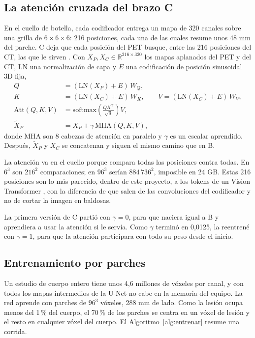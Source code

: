 \subsection{La atención cruzada del brazo C}

En el cuello de botella, cada codificador entrega un mapa de 320 canales sobre una grilla de $6\times6\times6$: 216 posiciones, cada una de las cuales resume unos 48 mm del parche. C deja que cada posición del PET busque, entre las 216 posiciones del CT, las que le sirven \citep{vaswani2017}. Con $X_P, X_C \in \mathbb{R}^{216\times320}$ los mapas aplanados del PET y del CT, $\mathrm{LN}$ una normalización de capa y $E$ una codificación de posición sinusoidal 3D fija,
\begin{align}
Q &= (\mathrm{LN}(X_P)+E)\,W_Q, \\
K &= (\mathrm{LN}(X_C)+E)\,W_K, \qquad V = (\mathrm{LN}(X_C)+E)\,W_V, \\
\mathrm{Att}(Q,K,V) &= \mathrm{softmax}\!\left(\frac{QK^\top}{\sqrt{d}}\right) V, \\
\tilde X_P &= X_P + \gamma\,\mathrm{MHA}(Q,K,V),
\end{align}
donde MHA son 8 cabezas de atención en paralelo y $\gamma$ es un escalar aprendido. Después, $\tilde X_P$ y $X_C$ se concatenan y siguen el mismo camino que en B.

La atención va en el cuello porque compara todas las posiciones contra todas. En $6^3$ son $216^2$ comparaciones; en $96^3$ serían $884\,736^2$, imposible en 24 GB. Estas 216 posiciones son lo más parecido, dentro de este proyecto, a los tokens de un Vision Transformer \citep{dosovitskiy2021,hatamizadeh2022}, con la diferencia de que salen de las convoluciones del codificador y no de cortar la imagen en baldosas.

La primera versión de C partió con $\gamma=0$, para que naciera igual a B y aprendiera a usar la atención si le servía. Como $\gamma$ terminó en 0,0125, la reentrené con $\gamma=1$, para que la atención participara con todo su peso desde el inicio.

\subsection{Entrenamiento por parches}

Un estudio de cuerpo entero tiene unos 4,6 millones de vóxeles por canal, y con todos los mapas intermedios de la U-Net no cabe en la memoria del equipo. La red aprende con parches de $96^3$ vóxeles, 288 mm de lado. Como la lesión ocupa menos del 1\,\% del cuerpo, el 70\,\% de los parches se centra en un vóxel de lesión y el resto en cualquier vóxel del cuerpo. El Algoritmo~\ref{alg:entrenar} resume una corrida.

